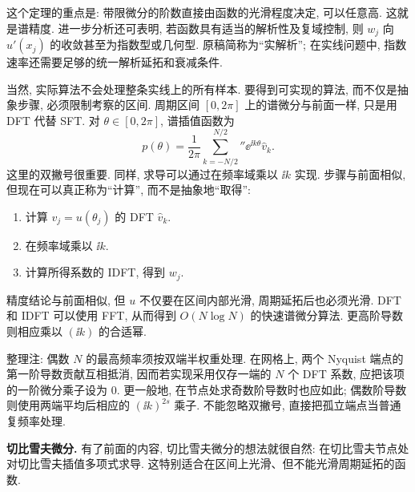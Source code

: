 这个定理的重点是: 带限微分的阶数直接由函数的光滑程度决定, 可以任意高. 这就是谱精度. 进一步分析还可表明, 若函数具有适当的解析性及复域控制, 则 $w_j$ 向 $u'(x_j)$ 的收敛甚至为指数型或几何型. 原稿简称为“实解析”; 在实线问题中, 指数速率还需要足够的统一解析延拓和衰减条件.

当然, 实际算法不会处理整条实线上的所有样本. 要得到可实现的算法, 而不仅是抽象步骤, 必须限制考察的区间. 周期区间 $[0,2\pi]$ 上的谱微分与前面一样, 只是用 DFT 代替 SFT. 对 $\theta\in[0,2\pi]$, 谱插值函数为
\[
p(\theta)=\frac1{2\pi}\sum_{k=-N/2}^{N/2}{}''\ee^{\ii k\theta}\widehat v_k.
\]
这里的双撇号很重要. 同样, 求导可以通过在频率域乘以 $\ii k$ 实现. 步骤与前面相似, 但现在可以真正称为“计算”, 而不是抽象地“取得”:
\begin{enumerate}
\item 计算 $v_j=u(\theta_j)$ 的 DFT $\widehat v_k$.
\item 在频率域乘以 $\ii k$.
\item 计算所得系数的 IDFT, 得到 $w_j$.
\end{enumerate}
精度结论与前面相似, 但 $u$ 不仅要在区间内部光滑, 周期延拓后也必须光滑. DFT 和 IDFT 可以使用 FFT, 从而得到 $O(N\log N)$ 的快速谱微分算法. 更高阶导数则相应乘以 $(\ii k)$ 的合适幂.
\begin{remark}
整理注: 偶数 $N$ 的最高频率须按双端半权重处理. 在网格上, 两个 Nyquist 端点的第一阶导数贡献互相抵消, 因而若实现采用仅存一端的 $N$ 个 DFT 系数, 应把该项的一阶微分乘子设为 $0$. 更一般地, 在节点处求奇数阶导数时也应如此; 偶数阶导数则使用两端平均后相应的 $(\ii k)^{2s}$ 乘子. 不能忽略双撇号, 直接把孤立端点当普通复频率处理.
\end{remark}

\textbf{切比雪夫微分.} 有了前面的内容, 切比雪夫微分的想法就很自然: 在切比雪夫节点处对切比雪夫插值多项式求导. 这特别适合在区间上光滑、但不能光滑周期延拓的函数.

